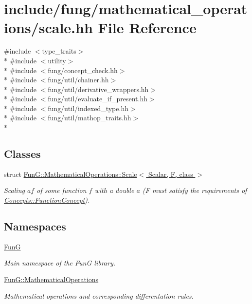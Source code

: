 \hypertarget{scale_8hh}{\section{include/fung/mathematical\-\_\-operations/scale.hh File Reference}
\label{scale_8hh}
}
{\ttfamily \#include $<$type\-\_\-traits$>$}\\*
{\ttfamily \#include $<$utility$>$}\\*
{\ttfamily \#include $<$fung/concept\-\_\-check.\-hh$>$}\\*
{\ttfamily \#include $<$fung/util/chainer.\-hh$>$}\\*
{\ttfamily \#include $<$fung/util/derivative\-\_\-wrappers.\-hh$>$}\\*
{\ttfamily \#include $<$fung/util/evaluate\-\_\-if\-\_\-present.\-hh$>$}\\*
{\ttfamily \#include $<$fung/util/indexed\-\_\-type.\-hh$>$}\\*
{\ttfamily \#include $<$fung/util/mathop\-\_\-traits.\-hh$>$}\\*
\subsection*{Classes}
\begin{DoxyCompactItemize}
\item 
struct \hyperlink{structFunG_1_1MathematicalOperations_1_1Scale}{Fun\-G\-::\-Mathematical\-Operations\-::\-Scale$<$ Scalar, F, class $>$}
\begin{DoxyCompactList}\small\item\em Scaling $ af $ of some function $ f $ with a double $ a $ (F must satisfy the requirements of \hyperlink{structFunG_1_1Concepts_1_1FunctionConcept}{Concepts\-::\-Function\-Concept}). \end{DoxyCompactList}\end{DoxyCompactItemize}
\subsection*{Namespaces}
\begin{DoxyCompactItemize}
\item 
\hyperlink{namespaceFunG}{Fun\-G}
\begin{DoxyCompactList}\small\item\em Main namespace of the Fun\-G library. \end{DoxyCompactList}\item 
\hyperlink{namespaceFunG_1_1MathematicalOperations}{Fun\-G\-::\-Mathematical\-Operations}
\begin{DoxyCompactList}\small\item\em Mathematical operations and corresponding differentation rules. \end{DoxyCompactList}\end{DoxyCompactItemize}
